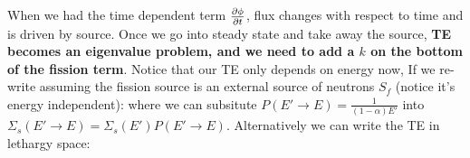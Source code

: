 \documentclass{school-22.211-notes}
\begin{document}
When we had the time dependent term $\frac{\partial \phi}{\partial t}$, flux changes with respect to time and is driven by source. Once we go into steady state and take away the source, \textbf{TE becomes an eigenvalue problem, and we need to add a $k$ on the bottom of the fission term}. Notice that our TE only depends on energy now,  
If we re-write assuming the fission source is an external source of neutrons $S_f$ (notice it's energy independent): 
where we can subsitute $P(E'\to E) = \frac{1}{(1-\alpha)E'}$ into $\Sigma_s(E' \to E) = \Sigma_s(E') P(E' \to E)$. Alternatively we can write the TE in lethargy space: 
\end{document}
